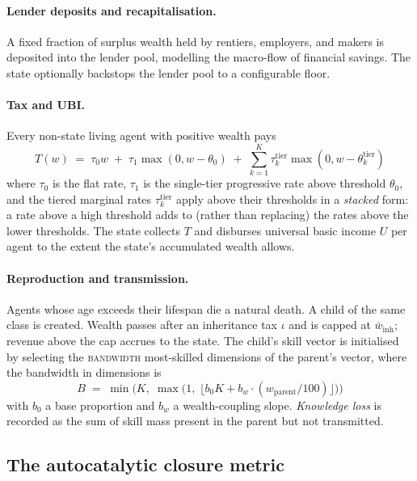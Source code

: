 \documentclass[11pt]{article}
\begin{document}
\paragraph{Lender deposits and recapitalisation.} A fixed fraction of
surplus wealth held by rentiers, employers, and makers is deposited
into the lender pool, modelling the macro-flow of financial savings.
The state optionally backstops the lender pool to a configurable floor.

\paragraph{Tax and UBI.} Every non-state living agent with positive
wealth pays
\begin{equation}
T(w) \;=\; \tau_0 w \;+\; \tau_1 \max(0, w - \theta_0)
       \;+\; \sum_{k=1}^{K} \tau^\text{tier}_k \max(0, w - \theta^\text{tier}_k)
\end{equation}
where $\tau_0$ is the flat rate, $\tau_1$ is the single-tier
progressive rate above threshold $\theta_0$, and the tiered marginal
rates $\tau^\text{tier}_k$ apply above their thresholds in a
\emph{stacked} form: a rate above a high threshold adds to (rather
than replacing) the rates above the lower thresholds. The state
collects $T$ and disburses universal basic income $U$ per agent to
the extent the state's accumulated wealth allows.

\paragraph{Reproduction and transmission.} Agents whose age exceeds
their lifespan die a natural death. A child of the same class is
created. Wealth passes after an inheritance tax $\iota$ and is capped
at $\bar{w}_{\text{inh}}$; revenue above the cap accrues to the state.
The child's skill vector is initialised by selecting the
\textsc{bandwidth} most-skilled dimensions of the parent's vector,
where the bandwidth in dimensions is
\begin{equation}
B \;=\; \min\!\Big( K,\; \max\!\big(1,\; \lfloor b_0 K + b_w \cdot
(w_{\text{parent}}/100) \rfloor\big)\Big)
\end{equation}
with $b_0$ a base proportion and $b_w$ a wealth-coupling slope.
\emph{Knowledge loss} is recorded as the sum of skill mass present in
the parent but not transmitted.

\subsection{The autocatalytic closure metric}
\label{sec:phi}
\end{document}
